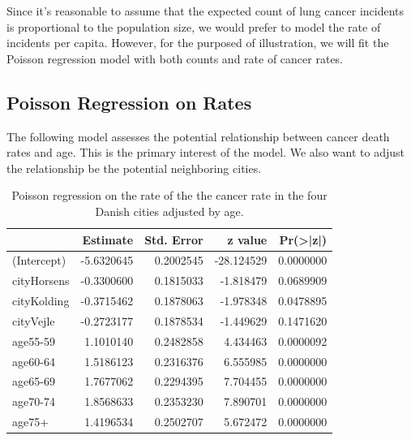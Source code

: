 \documentclass[
]{book}
\newenvironment{Shaded}{\begin{snugshade}}{\end{snugshade}}
\newcommand{\AttributeTok}[1]{\textcolor[rgb]{0.13,0.29,0.53}{#1}}
\newcommand{\FunctionTok}[1]{\textcolor[rgb]{0.13,0.29,0.53}{\textbf{#1}}}
\newcommand{\NormalTok}[1]{#1}
\newcommand{\OtherTok}[1]{\textcolor[rgb]{0.56,0.35,0.01}{#1}}
\newcommand{\SpecialCharTok}[1]{\textcolor[rgb]{0.81,0.36,0.00}{\textbf{#1}}}
\newcommand{\StringTok}[1]{\textcolor[rgb]{0.31,0.60,0.02}{#1}}
\begin{document}
Since it's reasonable to assume that the expected count of lung cancer incidents is proportional to the population size, we would prefer to model the rate of incidents per capita. However, for the purposed of illustration, we will fit the Poisson regression model with both counts and rate of cancer rates.

\hypertarget{poisson-regression-on-rates}{%
\subsection{Poisson Regression on Rates}\label{poisson-regression-on-rates}}

The following model assesses the potential relationship between cancer death rates and age. This is the primary interest of the model. We also want to adjust the relationship be the potential neighboring cities.

\begin{Shaded}
\end{Shaded}

\begin{table}

\caption{\label{tab:unnamed-chunk-144}Poisson regression on the rate of the the cancer rate in the four Danish cities adjusted by age.}
\centering
\begin{tabular}[t]{l|r|r|r|r}
\hline
  & Estimate & Std. Error & z value & Pr(>|z|)\\
\hline
(Intercept) & -5.6320645 & 0.2002545 & -28.124529 & 0.0000000\\
\hline
cityHorsens & -0.3300600 & 0.1815033 & -1.818479 & 0.0689909\\
\hline
cityKolding & -0.3715462 & 0.1878063 & -1.978348 & 0.0478895\\
\hline
cityVejle & -0.2723177 & 0.1878534 & -1.449629 & 0.1471620\\
\hline
age55-59 & 1.1010140 & 0.2482858 & 4.434463 & 0.0000092\\
\hline
age60-64 & 1.5186123 & 0.2316376 & 6.555985 & 0.0000000\\
\hline
age65-69 & 1.7677062 & 0.2294395 & 7.704455 & 0.0000000\\
\hline
age70-74 & 1.8568633 & 0.2353230 & 7.890701 & 0.0000000\\
\hline
age75+ & 1.4196534 & 0.2502707 & 5.672472 & 0.0000000\\
\hline
\end{tabular}
\end{table}
\end{document}
